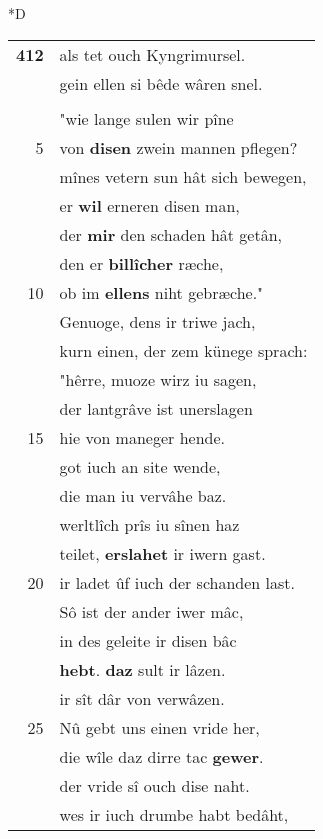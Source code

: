 \documentclass[8pt,a4paper,notitlepage]{article}
\begin{document}
\begin{table}[ht]
\begin{minipage}[t]{0.5\linewidth}
\small
\begin{center}*D
\end{center}
\begin{tabular}{rl}
\textbf{412} & als tet ouch Kyngrimursel.\\ 
 & gein ellen si bêde wâren snel.\\ 
 & \textit{\begin{large}D\end{large}}er künec mant die sîne:\\ 
 & "wie lange sulen wir pîne\\ 
5 & von \textbf{disen} zwein mannen pflegen?\\ 
 & mînes vetern sun hât sich bewegen,\\ 
 & er \textbf{wil} erneren disen man,\\ 
 & der \textbf{mir} den schaden hât getân,\\ 
 & den er \textbf{billîcher} ræche,\\ 
10 & ob im \textbf{ellens} niht gebræche."\\ 
 & Genuoge, dens ir triwe jach,\\ 
 & kurn einen, der zem künege sprach:\\ 
 & "hêrre, muoze wirz iu sagen,\\ 
 & der lantgrâve ist unerslagen\\ 
15 & hie von maneger hende.\\ 
 & got iuch an site wende,\\ 
 & die man iu vervâhe baz.\\ 
 & werltlîch prîs iu sînen haz\\ 
 & teilet, \textbf{erslahet} ir iwern gast.\\ 
20 & ir ladet ûf iuch der schanden last.\\ 
 & Sô ist der ander iwer mâc,\\ 
 & in des geleite ir disen bâc\\ 
 & \textbf{hebt}. \textbf{daz} sult ir lâzen.\\ 
 & ir sît dâr von verwâzen.\\ 
25 & Nû gebt uns einen vride her,\\ 
 & die wîle daz dirre tac \textbf{gewer}.\\ 
 & der vride sî ouch dise naht.\\ 
 & wes ir iuch drumbe habt bedâht,\\ 

\end{tabular}
\end{minipage}
\end{table}
\end{document}
